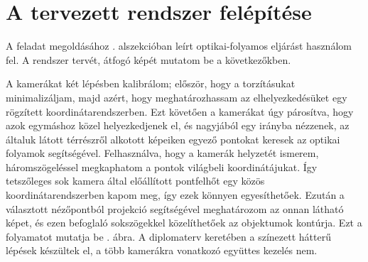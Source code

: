 \section{A tervezett rendszer felépítése}

A feladat megoldásához . alszekcióban leírt optikai-folyamos eljárást használom fel. A rendszer tervét, átfogó képét mutatom be a következőkben.

A kamerákat két lépésben kalibrálom; először, hogy a torzításukat minimalizáljam, majd azért, hogy meghatározhassam az elhelyezkedésüket egy rögzített koordinátarendszerben. Ezt követően a kamerákat úgy párosítva, hogy azok egymáshoz közel helyezkedjenek el, és nagyjából egy irányba nézzenek, az általuk látott térrészről alkotott képeiken egyező pontokat keresek az optikai folyamok segítségével. Felhasználva, hogy a kamerák helyzetét ismerem, háromszögeléssel megkaphatom a pontok világbeli koordinátájukat. Így tetszőleges sok kamera által előállított pontfelhőt egy közös koordinátarendszerben kapom meg, így ezek könnyen egyesíthetőek. Ezután a választott nézőpontból projekció segítségével meghatározom az onnan látható képet, és ezen befoglaló sokszögekkel közelíthetőek az objektumok kontúrja. Ezt a folyamatot mutatja be . ábra. A diplomaterv keretében a színezett hátterű lépések készültek el, a több kamerákra vonatkozó együttes kezelés nem.

